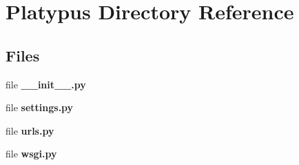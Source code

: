 \section{Platypus Directory Reference}
\label{dir_623ace06ab1cefbafc0355e699fb5b6c}
\subsection*{Files}
\begin{DoxyCompactItemize}
\item 
file {\bf \+\_\+\+\_\+init\+\_\+\+\_\+.\+py}
\item 
file {\bf settings.\+py}
\item 
file {\bf urls.\+py}
\item 
file {\bf wsgi.\+py}
\end{DoxyCompactItemize}
